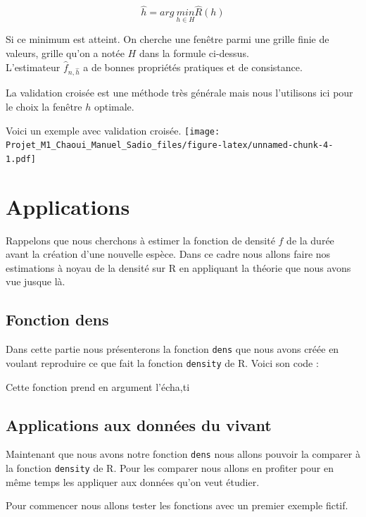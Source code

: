 \documentclass[
]{book}
\begin{document}
\[
\hat{h} = arg\ \underset{h\in H}{min}\hat{R}(h)
\]

Si ce minimum est atteint. On cherche une fenêtre parmi une grille finie de valeurs, grille qu'on a notée \(H\) dans la formule ci-dessus.\\
L'estimateur \(\hat{f}_{n,\hat{h}}\) a de bonnes propriétés pratiques et de consistance.

La validation croisée est une méthode très générale mais nous l'utilisons ici pour le choix la fenêtre \(h\) optimale.

Voici un exemple avec validation croisée.
\texttt{[image: Projet\_M1\_Chaoui\_Manuel\_Sadio\_files/figure-latex/unnamed-chunk-4-1.pdf]}

\hypertarget{applications}{%
\chapter{Applications}\label{applications}}

Rappelons que nous cherchons à estimer la fonction de densité \(f\) de la durée avant la création d'une nouvelle espèce. Dans ce cadre nous allons faire nos estimations à noyau de la densité sur R en appliquant la théorie que nous avons vue jusque là.

\hypertarget{fonction-dens}{%
\section{Fonction dens}\label{fonction-dens}}

Dans cette partie nous présenterons la fonction \texttt{dens} que nous avons créée en voulant reproduire ce que fait la fonction \texttt{density} de R.
Voici son code :

Cette fonction prend en argument l'écha,ti

\hypertarget{applications-aux-donnuxe9es-du-vivant}{%
\section{Applications aux données du vivant}\label{applications-aux-donnuxe9es-du-vivant}}

Maintenant que nous avons notre fonction \texttt{dens} nous allons pouvoir la comparer à la fonction \texttt{density} de R. Pour les comparer nous allons en profiter pour en même temps les appliquer aux données qu'on veut étudier.

Pour commencer nous allons tester les fonctions avec un premier exemple fictif.
\end{document}
